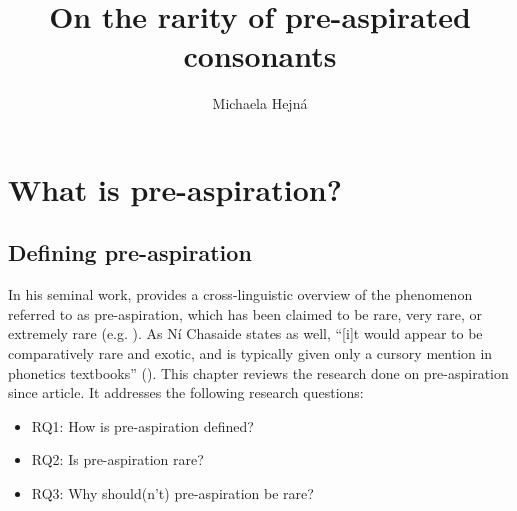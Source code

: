 \documentclass[output=paper]{langscibook}
\author{Michaela Hejná\orcid{0000-0002-9328-2603}\affiliation{Aarhus University}}
\title{On the rarity of pre-aspirated consonants}
\begin{document}
\maketitle


\section{What is pre-aspiration?}\label{sec:hejna:1}
\subsection{Defining pre-aspiration}\label{sec:hejna:1.1}

In his seminal work, \citet{Silverman2003} provides a cross-linguistic overview of the phenomenon referred to as pre-aspiration, which has been claimed to be rare, very rare, or extremely rare (e.g. \cites[2, 7]{Bladon1986}{JonesLlamas2003}[147]{NanceStuart-Smith2013}{Roos1998}{Silverman2003}{StevensHajek2007}). As Ní Chasaide states as well, “[i]t would appear to be comparatively rare and exotic, and is typically given only a cursory mention in phonetics textbooks” (\citeyear[34]{Chasaide1985}). This chapter reviews the research done on pre\hyp aspiration since  article. It addresses the following research questions:

\begin{itemize}
\item RQ1: How is pre\hyp aspiration defined?
\item RQ2: Is pre\hyp aspiration rare?
\item RQ3: Why should(n’t) pre\hyp aspiration be rare?
\end{itemize}
\end{document}

